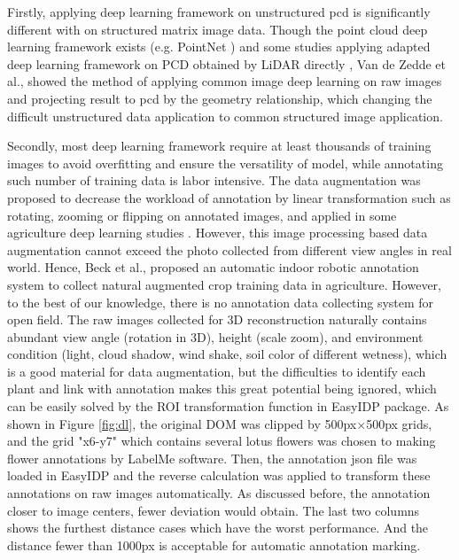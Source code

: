 \documentclass[doublespacing]{configs/bmcart}
\begin{document}
Firstly, applying deep learning framework on unstructured \acrshort*{pcd} is significantly different with on structured matrix image data. Though the point cloud deep learning framework exists (e.g. PointNet \cite{qi_pointnet_2017}) and some studies applying adapted deep learning framework on PCD obtained by LiDAR directly \cite{jin_deep_2018, jin_stemleaf_2019, jin_non-destructive_2020}, Van de Zedde et al., \cite{van_plant-part_2019} showed the method of applying common image deep learning on raw images and projecting result to \acrshort*{pcd} by the geometry relationship, which changing the difficult unstructured data application to common structured image application.

Secondly, most deep learning framework require at least thousands of training images to avoid overfitting and ensure the versatility of model, while annotating such number of training data is labor intensive. The data augmentation was proposed to decrease the workload of annotation by linear transformation such as rotating, zooming or flipping on annotated images, and applied in some agriculture deep learning studies \cite{zhou_fast_2020, han_real-time_2020}. However, this image processing based data augmentation cannot exceed the photo collected from different view angles in real world. Hence, Beck et al.,\cite{beck_embedded_2020} proposed an automatic indoor robotic annotation system to collect natural augmented crop training data in agriculture. However, to the best of our knowledge, there is no annotation data collecting system for open field. The raw images collected for 3D reconstruction naturally contains abundant view angle (rotation in 3D), height (scale zoom), and environment condition (light, cloud shadow, wind shake, soil color of different wetness), which is a good material for data augmentation, but the difficulties to identify each plant and link with annotation makes this great potential being ignored, which can be easily solved by the ROI transformation function in EasyIDP package. As shown in Figure \ref{fig:dl}, the original DOM was clipped by 500px$\times$500px grids, and the grid "x6-y7" which contains several lotus flowers was chosen to making flower annotations by LabelMe software. Then, the annotation json file was loaded in EasyIDP and the reverse calculation was applied to transform these annotations on raw images automatically. As discussed before, the annotation closer to image centers, fewer deviation would obtain. The last two columns shows the furthest distance cases which have the worst performance. And the distance fewer than 1000px is acceptable for automatic annotation marking.
\end{document}
